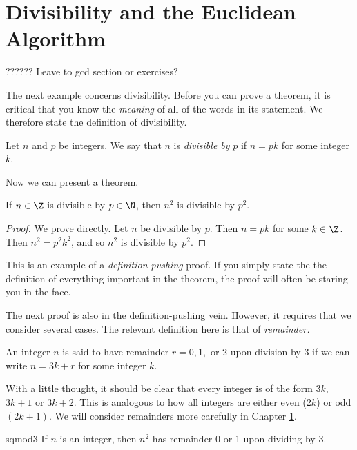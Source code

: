\section{Divisibility and the Euclidean Algorithm}\label{sec:gcd}

\iffalse
??????
 Leave to gcd section or exercises?

The next example concerns divisibility. Before you can prove a theorem, it is critical that you know the \emph{meaning} of all of the words in its statement. We therefore state the definition of divisibility.

\begin{defn}{}{}
Let $n$ and $p$ be integers. We say that $n$ is \emph{divisible by} $p$ if $n=pk$ for some integer $k$.
\end{defn}

 Now we can present a theorem.

\begin{thm}{}{}
If $n\in\Z$ is divisible by $p\in\N$, then $n^2$ is divisible by $p^2$.
\end{thm}

\begin{proof}
We prove directly. Let $n$ be divisible by $p$. Then $n=pk$ for some $k\in\Z$. Then $n^2=p^2k^2$, and so $n^2$ is divisible by $p^2$.
\end{proof}

 This is an example of a \emph{definition-pushing} proof. If you simply state the the definition of everything important in the theorem, the proof will often be staring you in the face.


The next proof is also in the definition-pushing vein. However, it requires that we consider several cases. The relevant definition here is that of \emph{remainder.}

\begin{defn}{}{}
An integer $n$ is said to have remainder $r=0,1,$ or 2 upon division by 3 if we can write $n=3k+r$ for some integer $k$.
\end{defn}

 With a little thought, it should be clear that every integer is of the form $3k$, $3k+1$ or $3k+2$. This is analogous to how all integers are either even ($2k$) or odd $(2k+1)$. We will consider remainders more carefully in Chapter \ref{sec:gcd}.

\begin{thm}{}{sqmod3}
If $n$ is an integer, then $n^2$ has remainder 0 or 1 upon dividing by 3.
\end{thm}

